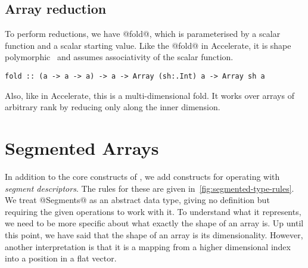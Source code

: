 \subsection{Array reduction}
To perform reductions, we have @fold@, which is parameterised by a scalar function and a scalar starting value. Like the @fold@ in Accelerate, it is shape polymorphic~\citep{Keller:Repa} and assumes associativity of the scalar function.
%
\begin{lstlisting}
fold :: (a -> a -> a) -> a -> Array (sh:.Int) a -> Array sh a
\end{lstlisting}
%
Also, like in Accelerate, this is a multi-dimensional fold. It works over arrays of arbitrary rank by  reducing only along the inner dimension.


\section{Segmented Arrays}
In addition to the core constructs of \ndp{}, we add constructs for operating with \emph{segment descriptors}. The rules for these are given in~\ref{fig:segmented-type-rules}. We treat @Segments@ as an abstract data type, giving no definition but requiring the given operations to work with it. To understand what it represents, we need to be more specific about what exactly the shape of an array is. Up until this point, we have said that the shape of an array is its dimensionality. However, another interpretation is that it is a mapping from a higher dimensional index into a position in a flat vector.

